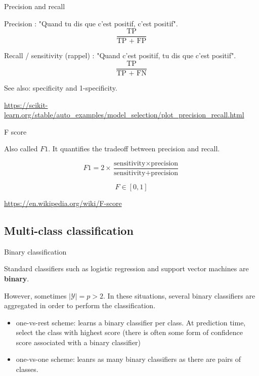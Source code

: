 \documentclass[usenames,dvipsnames]{beamer}
\begin{document}
\begin{frame}{Precision and recall}

    Precision : "Quand tu dis que c'est positif, c'est positif".
    \begin{equation}
        \frac{\text{TP}}{\text{TP + FP}}       
    \end{equation}

    Recall / sensitivity (rappel) : "Quand c'est positif, tu dis que c'est positif".
    \begin{equation}
        \frac{\text{TP}}{\text{TP + FN}}
    \end{equation}

    See also: specificity and 1-specificity.

    \url{https://scikit-learn.org/stable/auto_examples/model_selection/plot_precision_recall.html}
    
\end{frame}

\begin{frame}{F score}

    Also called $F1$. It quantifies the tradeoff between precision and recall.

\begin{equation}
    F1 = 2 \times \frac{\text{sensitivity}\times \text{precision}}{\text{sensitivity}+ \text{precision}} 
\end{equation}

\begin{equation}
    F\in[0, 1]
\end{equation}

    \url{https://en.wikipedia.org/wiki/F-score} 
    
\end{frame}

\subsection{Multi-class classification}%
\label{sub:multi_class_classification}

\begin{frame}{Binary classification}

    Standard classifiers such as logistic regression and support vector
    machines are \textbf{{binary}}. 

    However, sometimes $|\mathcal{Y} |=p>2$. In these situations, several binary classifiers are aggregated in order to perform the classification.
    \begin{itemize}
	\item one-vs-rest scheme: learns a binary classifier per class. At prediction time, select the class with highest score (there is often some form of confidence score associated with a binary classifier)
    	\item one-vs-one scheme: leanrs as many binary classifiers as there are pairs of classes.
    \end{itemize}
    
\end{frame}
\end{document}
